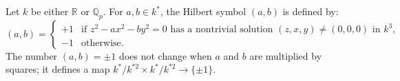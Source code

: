 Let $k$ be either $\mathbb{R}$ or $\mathbb{Q}_p$. For $a, b \in k^*$, the Hilbert symbol $(a, b)$ is defined by:
$$(a, b) = \begin{cases} +1 & \text{if } z^2 - ax^2 - by^2 = 0 \text{ has a nontrivial solution } (z,x,y) \neq (0,0,0) \text{ in } k^3, \\ -1 & \text{otherwise.} \end{cases}$$
The number $(a, b) = \pm 1$ does not change when $a$ and $b$ are multiplied by squares; it defines a map $k^*/k^{*2} \times k^*/k^{*2} \rightarrow \{\pm 1\}$.

